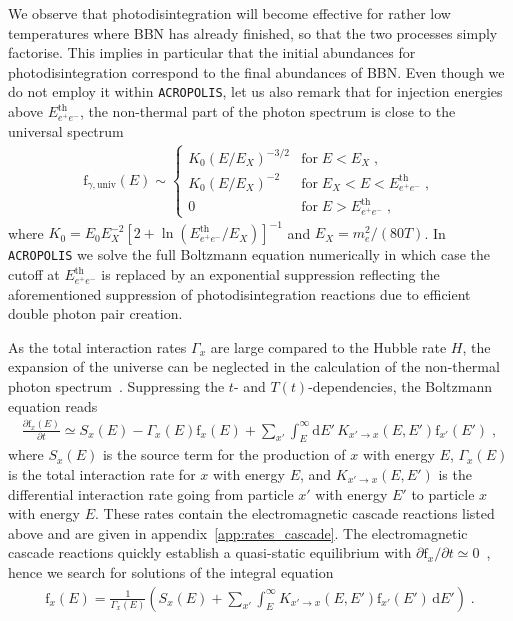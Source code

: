 \documentclass[11pt,a4paper]{article}
\newcommand{\fpdi}{\mathrm{f}}
\renewcommand{\d}{\text{d}}
\newcommand{\eqsp}{\;}
\newcommand{\X}{x}
\begin{document}
We observe that photodisintegration will become effective for rather low temperatures where BBN has already finished, so that the two processes simply factorise.
This implies in particular that the initial abundances for photodisintegration correspond to the final abundances of BBN.
Even though we do not employ it within \texttt{ACROPOLIS}, let us also remark that for injection energies above $E_{e^+ e^-}^\mathrm{th}$, the non-thermal part of the photon spectrum is close to the universal spectrum~\cite{Cyburt:2002uv}
\begin{align}
\mathrm{f}_{\gamma, \mathrm{univ}} (E) \sim \begin{cases} K_0 (E/E_X)^{-3/2} &\text{for} \; E < E_X\eqsp, \\
K_0 (E/E_X)^{-2} &\text{for} \; E_X < E < E_{e^+ e^-}^\mathrm{th}\eqsp, \\
0 &\text{for} \; E > E_{e^+ e^-}^\mathrm{th}\eqsp, \end{cases}
\end{align}
where $K_0 = E_0 E_X^{-2} [2 + \ln (E_{e^+ e^-}^\mathrm{th} / E_X)]^{-1}$ and $E_X = m_e^2 / (80 T)$. In \texttt{ACROPOLIS} we solve the full Boltzmann equation numerically in which case
the cutoff at $E_{e^+ e^-}^\mathrm{th}$ is replaced by an exponential suppression
reflecting the aforementioned suppression of photodisintegration reactions due to efficient double photon pair creation.

As the total interaction rates $\Gamma_x$ are large compared to the Hubble rate $H$, the expansion of the universe can be neglected in the calculation of the non-thermal photon spectrum~\cite{Cyburt:2002uv,Jedamzik:2006xz}. Suppressing the $t$- and $T(t)$-dependencies, the Boltzmann equation reads
\begin{align}
\frac{\partial \fpdi_\X(E)}{\partial t} \simeq S_\X(E) - \Gamma_\X(E)\fpdi_\X(E) + \sum_{\X'}\int_E^\infty \d E' \, K_{\X' \rightarrow \X}(E, E')\fpdi_{\X'}(E')\eqsp,
\label{eq:boltzmann_cascade}
\end{align}
where $S_x (E)$ is the source term for the production of $x$ with energy $E$, $\Gamma_x (E)$ is the total interaction rate for $x$ with energy $E$, and $K_{x' \rightarrow x} (E, E')$ is the differential interaction rate going from particle $x'$ with energy $E'$ to particle $x$ with energy $E$. These rates contain the electromagnetic cascade reactions listed above and are given in appendix~\ref{app:rates_cascade}. The electromagnetic cascade reactions quickly establish a quasi-static equilibrium with $\partial \fpdi_x / \partial t \simeq 0$~\cite{Cyburt:2002uv,Jedamzik:2006xz}, hence we search for solutions of the integral equation
\begin{align}
\fpdi_\X(E) = \frac{1}{\Gamma_\X(E)} \left( S_\X(E) + \sum_{\X'} \int_E^\infty K_{\X' \rightarrow \X}(E, E')\fpdi_{\X'}(E')\,\d E' \right)\eqsp.
\label{eq:cascade_f}
\end{align}
\end{document}

